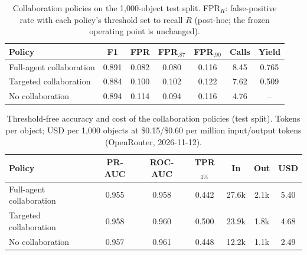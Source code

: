 \begin{table}[t]
\centering
\caption{Collaboration policies on the 1,000-object test split. FPR$_{R}$: false-positive rate with each
policy's threshold set to recall $R$ (post-hoc; the frozen operating point is unchanged).}
\label{tab:collaboration}
\setlength{\tabcolsep}{3pt}
\begin{tabular}{lcccccc}
\toprule
Policy & F1 & FPR & FPR$_{.87}$ & FPR$_{.90}$ & Calls & Yield \\
\midrule
Full-agent collaboration & 0.891 & 0.082 & 0.080 & 0.116 & 8.45 & 0.765 \\
Targeted collaboration & 0.884 & 0.100 & 0.102 & 0.122 & 7.62 & 0.509 \\
No collaboration & 0.894 & 0.114 & 0.094 & 0.116 & 4.76 & -- \\
\bottomrule
\end{tabular}
\end{table}

\begin{table}[t]
\centering
\caption{Threshold-free accuracy and cost of the collaboration policies (test split). Tokens per object;
USD per 1,000 objects at \$0.15/\$0.60 per million input/output
tokens (OpenRouter, 2026-11-12).}
\label{tab:collaboration-cost}
\setlength{\tabcolsep}{3pt}
\begin{tabular}{lcccccc}
\toprule
Policy & PR-AUC & ROC-AUC & TPR$_{1\%}$ & In & Out & USD \\
\midrule
Full-agent collaboration & 0.955 & 0.958 & 0.442 & 27.6k & 2.1k & 5.40 \\
Targeted collaboration & 0.958 & 0.960 & 0.500 & 23.9k & 1.8k & 4.68 \\
No collaboration & 0.957 & 0.961 & 0.448 & 12.2k & 1.1k & 2.49 \\
\bottomrule
\end{tabular}
\end{table}
